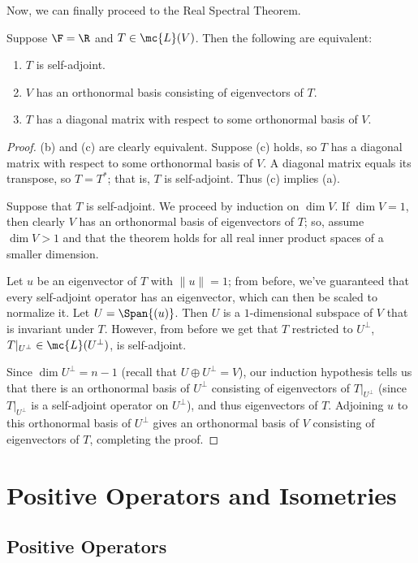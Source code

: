 \documentclass[math0540-lecture-notes.tex]{subfiles}
\begin{document}
Now, we can finally proceed to the Real Spectral Theorem.
\begin{theorem}{}
  Suppose $\F=\R$ and $T\in \mc{L}(V)$. Then the following are equivalent:
  \begin{enumerate}
    \item $T$ is self-adjoint.
    \item $V$ has an orthonormal basis consisting of eigenvectors of $T$.
    \item $T$ has a diagonal matrix with respect to some orthonormal basis of $V$.
  \end{enumerate}
\end{theorem}
\begin{proof}[Proof]
  (b) and (c) are clearly equivalent. Suppose (c) holds, so $T$ has a diagonal matrix with respect
  to some orthonormal basis of $V$. A diagonal matrix equals its transpose, so $T=T^*$; that is, $T$
  is self-adjoint. Thus (c) implies (a).

  Suppose that $T$ is self-adjoint. We proceed by induction on $\dim{V}$. If $\dim{V}=1$, then
  clearly $V$ has an orthonormal basis of eigenvectors of $T$; so, assume $\dim{V}>1$ and that the
  theorem holds for all real inner product spaces of a smaller dimension.

  Let $u$ be an eigenvector of $T$ with $\|u\|=1$; from before, we've guaranteed that every
  self-adjoint operator has an eigenvector, which can then be scaled to normalize it. Let
  $U=\Span{(u)}$. Then $U$ is a $1$-dimensional subspace of $V$ that is invariant under $T$.
  However, from before we get that $T$ restricted to $U^{\bot}$, $T|_{U^{\bot}}\in
  \mc{L}(U^{\bot})$, is self-adjoint.

  Since $\dim{U^{\bot}}=n-1$ (recall that $U\oplus U^{\bot}=V$), our induction hypothesis tells us
  that there is an orthonormal basis of $U^{\bot}$ consisting of eigenvectors of $T|_{U^{\bot}}$
  (since $T|_{U^{\bot}}$ is a self-adjoint operator on $U^{\bot}$), and thus eigenvectors of $T$.
  Adjoining $u$ to this orthonormal basis of $U^{\bot}$ gives an orthonormal basis of $V$ consisting
  of eigenvectors of $T$, completing the proof.
\end{proof}

\section{Positive Operators and Isometries}
\subsection{Positive Operators}
\end{document}
